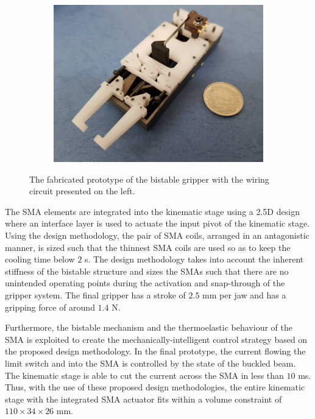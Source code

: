 \begin{figure}[hbt!]
  \begin{subfigure}[b]{0.72\textwidth}
      \includegraphics[width=\textwidth]{images/chap7/smabb-proto-iso.jpg}
  \end{subfigure}
  \caption{The fabricated prototype of the bistable gripper with the wiring circuit presented on the left.}
  \label{fig:final-prototype}
\end{figure}

The SMA elements are integrated into the kinematic stage using a 2.5D design where an interface layer is used to actuate the input pivot of the kinematic stage. Using the design methodology, the pair of SMA coils, arranged in an antagonistic manner, is sized such that the thinnest SMA coils are used so as to keep the cooling time below $2$ s. The design methodology takes into account the inherent stiffness of the bistable structure and sizes the SMAs such that there are no unintended operating points during the activation and snap-through of the gripper system. The final gripper has a stroke of $2.5$ mm per jaw and has a gripping force of around $1.4$ N.

Furthermore, the bistable mechanism and the thermoelastic behaviour of the SMA is exploited to create the mechanically-intelligent control strategy based on the proposed design methodology. In the final prototype, the current flowing the limit switch and into the SMA is controlled by the state of the buckled beam. The kinematic stage is able to cut the current across the SMA in less than $10$ ms. Thus, with the use of these proposed design methodologies, the entire kinematic stage with the integrated SMA actuator fits within a volume constraint of $110 \times 34 \times 26$ mm.

